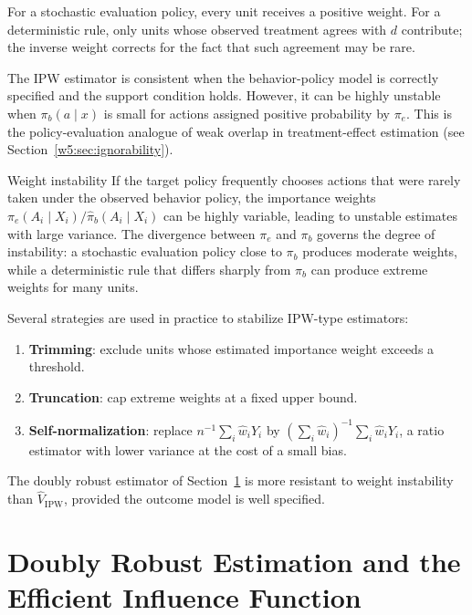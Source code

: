 \documentclass[master.tex]{subfiles}
\begin{document}
For a stochastic evaluation policy, every unit receives a positive weight.  For a deterministic rule, only units whose observed treatment agrees with $d$ contribute; the inverse weight corrects for the fact that such agreement may be rare.

The IPW estimator is consistent when the behavior-policy model is correctly specified and the support condition holds.  However, it can be highly unstable when $\pi_b(a\mid x)$ is small for actions assigned positive probability by $\pi_e$.  This is the policy-evaluation analogue of weak overlap in treatment-effect estimation (see Section~\ref{w5:sec:ignorability}).

\begin{warn}{Weight instability}
\label{w13:warn:instability}
If the target policy frequently chooses actions that were rarely taken under the observed behavior policy, the importance weights $\pi_e(A_i\mid X_i)/\hat\pi_b(A_i\mid X_i)$ can be highly variable, leading to unstable estimates with large variance.  The divergence between $\pi_e$ and $\pi_b$ governs the degree of instability: a stochastic evaluation policy close to $\pi_b$ produces moderate weights, while a deterministic rule that differs sharply from $\pi_b$ can produce extreme weights for many units.
\end{warn}

\begin{remark}
\label{w13:rem:remedies}
Several strategies are used in practice to stabilize IPW-type estimators:
\begin{enumerate}
    \item \textbf{Trimming}: exclude units whose estimated importance weight exceeds a threshold.
    \item \textbf{Truncation}: cap extreme weights at a fixed upper bound.
    \item \textbf{Self-normalization}: replace $n^{-1}\sum_i \hat w_i Y_i$ by $(\sum_i \hat w_i)^{-1}\sum_i \hat w_i Y_i$, a ratio estimator with lower variance at the cost of a small bias.
\end{enumerate}
The doubly robust estimator of Section~\ref{w13:sec:dr} is more resistant to weight instability than $\hat V_{\mathrm{IPW}}$, provided the outcome model is well specified.
\end{remark}

\section{Doubly Robust Estimation and the Efficient Influence Function}
\label{w13:sec:dr}
\end{document}
